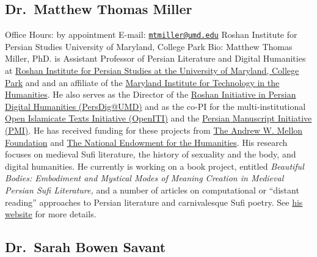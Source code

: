 \documentclass[
]{book}
\begin{document}
\hypertarget{dr.-matthew-thomas-miller}{%
\subsection{Dr.~Matthew Thomas Miller}\label{dr.-matthew-thomas-miller}}

Office Hours: by appointment
E-mail: \href{mailto:mtmiller@umd.edu}{\nolinkurl{mtmiller@umd.edu}}
Roshan Institute for Persian Studies
University of Maryland, College Park
Bio: Matthew Thomas Miller, PhD. is Assistant Professor of Persian Literature and Digital Humanities at \href{http://sllc.umd.edu/persian}{Roshan Institute for Persian Studies at the University of Maryland, College Park} and and an affiliate of the \href{https://mith.umd.edu/people/}{Maryland Institute for Technology in the Humanities}. He also serves as the Director of the \href{http://persdig.umd.edu/}{Roshan Initiative in Persian Digital Humanities (PersDig@UMD)} and as the co-PI for the multi-institutional \href{https://www.openiti.org/}{Open Islamicate Texts Initiative (OpenITI)} and the \href{http://www.persianmanuscript.org/}{Persian Manuscript Initiative (PMI)}. He has received funding for these projects from \href{https://mellon.org/}{The Andrew W. Mellon Foundation} and \href{https://www.neh.gov/}{The National Endowment for the Humanities}. His research focuses on medieval Sufi literature, the history of sexuality and the body, and digital humanities. He currently is working on a book project, entitled \emph{Beautiful Bodies: Embodiment and Mystical Modes of Meaning Creation in Medieval Persian Sufi Literature,} and a number of articles on computational or ``distant reading'' approaches to Persian literature and carnivalesque Sufi poetry. See \href{https://matthewthomasmiller.github.io/}{his website} for more details.

\hypertarget{dr.-sarah-bowen-savant}{%
\subsection{Dr.~Sarah Bowen Savant}\label{dr.-sarah-bowen-savant}}
\end{document}
